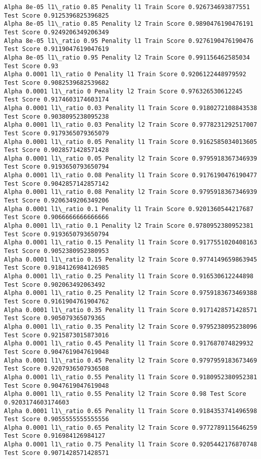 \documentclass[11pt]{article}
\begin{document}
\begin{Verbatim}[commandchars=\\\{\}]
Alpha 8e-05 l1\_ratio 0.85 Penality l1 Train Score 0.926734693877551 Test Score 0.9125396825396825
Alpha 8e-05 l1\_ratio 0.85 Penality l2 Train Score 0.9890476190476191 Test Score 0.9249206349206349
Alpha 8e-05 l1\_ratio 0.95 Penality l1 Train Score 0.9276190476190476 Test Score 0.9119047619047619
Alpha 8e-05 l1\_ratio 0.95 Penality l2 Train Score 0.991156462585034 Test Score 0.93
Alpha 0.0001 l1\_ratio 0 Penality l1 Train Score 0.9206122448979592 Test Score 0.9082539682539682
Alpha 0.0001 l1\_ratio 0 Penality l2 Train Score 0.976326530612245 Test Score 0.9174603174603174
Alpha 0.0001 l1\_ratio 0.03 Penality l1 Train Score 0.9180272108843538 Test Score 0.9038095238095238
Alpha 0.0001 l1\_ratio 0.03 Penality l2 Train Score 0.9778231292517007 Test Score 0.9179365079365079
Alpha 0.0001 l1\_ratio 0.05 Penality l1 Train Score 0.9162585034013605 Test Score 0.9028571428571428
Alpha 0.0001 l1\_ratio 0.05 Penality l2 Train Score 0.9795918367346939 Test Score 0.9193650793650794
Alpha 0.0001 l1\_ratio 0.08 Penality l1 Train Score 0.9176190476190477 Test Score 0.9042857142857142
Alpha 0.0001 l1\_ratio 0.08 Penality l2 Train Score 0.9795918367346939 Test Score 0.9206349206349206
Alpha 0.0001 l1\_ratio 0.1 Penality l1 Train Score 0.9201360544217687 Test Score 0.9066666666666666
Alpha 0.0001 l1\_ratio 0.1 Penality l2 Train Score 0.9780952380952381 Test Score 0.9193650793650794
Alpha 0.0001 l1\_ratio 0.15 Penality l1 Train Score 0.9177551020408163 Test Score 0.9052380952380953
Alpha 0.0001 l1\_ratio 0.15 Penality l2 Train Score 0.9774149659863945 Test Score 0.9184126984126985
Alpha 0.0001 l1\_ratio 0.25 Penality l1 Train Score 0.916530612244898 Test Score 0.902063492063492
Alpha 0.0001 l1\_ratio 0.25 Penality l2 Train Score 0.9759183673469388 Test Score 0.9161904761904762
Alpha 0.0001 l1\_ratio 0.35 Penality l1 Train Score 0.9171428571428571 Test Score 0.905079365079365
Alpha 0.0001 l1\_ratio 0.35 Penality l2 Train Score 0.9795238095238096 Test Score 0.9215873015873016
Alpha 0.0001 l1\_ratio 0.45 Penality l1 Train Score 0.917687074829932 Test Score 0.9047619047619048
Alpha 0.0001 l1\_ratio 0.45 Penality l2 Train Score 0.9797959183673469 Test Score 0.9207936507936508
Alpha 0.0001 l1\_ratio 0.55 Penality l1 Train Score 0.9180952380952381 Test Score 0.9047619047619048
Alpha 0.0001 l1\_ratio 0.55 Penality l2 Train Score 0.98 Test Score 0.9203174603174603
Alpha 0.0001 l1\_ratio 0.65 Penality l1 Train Score 0.9184353741496598 Test Score 0.9055555555555556
Alpha 0.0001 l1\_ratio 0.65 Penality l2 Train Score 0.9772789115646259 Test Score 0.916984126984127
Alpha 0.0001 l1\_ratio 0.75 Penality l1 Train Score 0.9205442176870748 Test Score 0.9071428571428571

\end{Verbatim}
\end{document}
